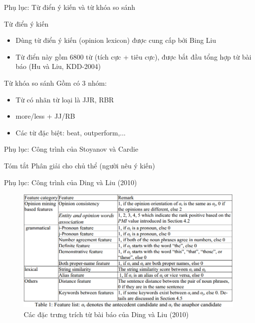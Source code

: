 \documentclass[9pt,xcolor=table,hyperref=unicode]{beamer}
\begin{document}
		\begin{frame}{Phụ lục: Từ điển ý kiến và từ khóa so sánh}
			\begin{block}{Từ điển ý kiến}
				\begin{itemize}
					\item Dùng từ điển ý kiến (opinion lexicon) được cung cấp bởi Bing Liu \footnotemark
					\item Từ điển này gồm 6800 từ (tích cực + tiêu cực), được bắt đầu tổng hợp từ bài báo (Hu và Liu, KDD-2004)
				\end{itemize}
			\end{block}
			\begin{block}{Từ khóa so sánh \footnotemark}
				Gồm có 3 nhóm:
				\begin{itemize}
					\item Từ có nhãn từ loại là JJR, RBR
					\item more/less + JJ/RB
					\item Các từ đặc biệt: beat, outperform,...
				\end{itemize}
			\end{block}
		\end{frame}

		\begin{frame}{Phụ lục: Công trình của Stoyanov và Cardie \footnotemark}
			\begin{block}{Tóm tắt}
				Phân giải cho chủ thể (người nêu ý kiến)
			\end{block}
		\end{frame}

		\begin{frame}{Phụ lục: Công trình của Ding và Liu (2010)}
			\begin{figure}[H]
				\centering							
				\includegraphics[scale=0.45]{images/base_features}				
				\caption{Các đặc trưng trích từ bài báo của Ding và Liu (2010)}				
			\end{figure}
		\end{frame}
\end{document}
